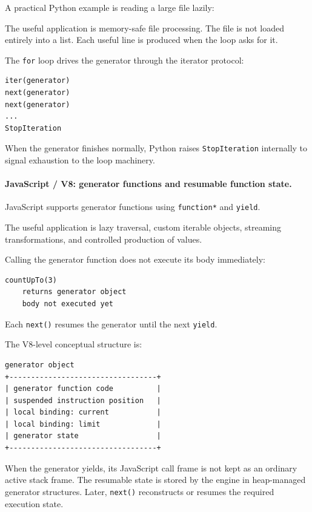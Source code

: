 A practical Python example is reading a large file lazily:

The useful application is memory-safe file processing. The file is not loaded entirely into a list. Each useful line is produced when the loop asks for it.

The \texttt{for} loop drives the generator through the iterator protocol:

\begin{verbatim}
iter(generator)
next(generator)
next(generator)
...
StopIteration
\end{verbatim}

When the generator finishes normally, Python raises \texttt{StopIteration} internally to signal exhaustion to the loop machinery.

\paragraph{JavaScript / V8: generator functions and resumable function state.}

JavaScript supports generator functions using \texttt{function*} and \texttt{yield}.

The useful application is lazy traversal, custom iterable objects, streaming transformations, and controlled production of values.

Calling the generator function does not execute its body immediately:

\begin{verbatim}
countUpTo(3)
    returns generator object
    body not executed yet
\end{verbatim}

Each \texttt{next()} resumes the generator until the next \texttt{yield}.

The V8-level conceptual structure is:

\begin{verbatim}
generator object
+----------------------------------+
| generator function code          |
| suspended instruction position   |
| local binding: current           |
| local binding: limit             |
| generator state                  |
+----------------------------------+
\end{verbatim}

When the generator yields, its JavaScript call frame is not kept as an ordinary active stack frame. The resumable state is stored by the engine in heap-managed generator structures. Later, \texttt{next()} reconstructs or resumes the required execution state.


